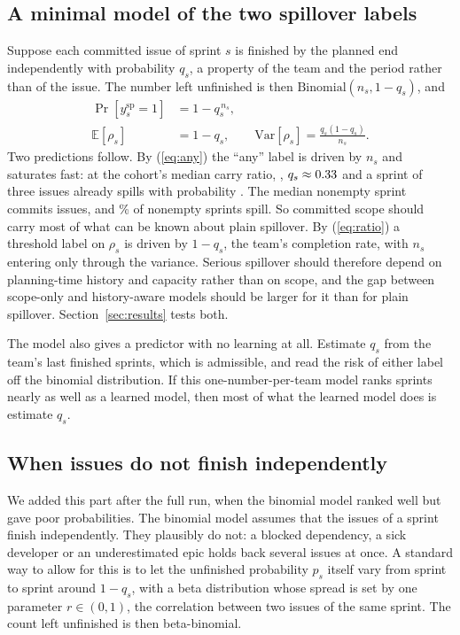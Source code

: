 \subsection{A minimal model of the two spillover labels}

Suppose each committed issue of sprint $s$ is finished by the planned end independently with probability $q_s$, a property of the team and the period rather than of the issue. The number left unfinished is then $\mathrm{Binomial}(n_s, 1 - q_s)$, and
\begin{align}
\Pr[y^{\mathrm{sp}}_s = 1] &= 1 - q_s^{\,n_s}, \label{eq:any}\\
\mathbb{E}[\rho_s] &= 1 - q_s, \qquad \mathrm{Var}[\rho_s] = \frac{q_s (1 - q_s)}{n_s}. \label{eq:ratio}
\end{align}
Two predictions follow. By (\ref{eq:any}) the ``any'' label is driven by $n_s$ and saturates fast: at the cohort's median carry ratio, \CarryMedian, $q_s \approx 0.33$ and a sprint of three issues already spills with probability \PSpillThree. The median nonempty sprint commits \MedianIssues{} issues, and \NonemptySpill\% of nonempty sprints spill. So committed scope should carry most of what can be known about plain spillover. By (\ref{eq:ratio}) a threshold label on $\rho_s$ is driven by $1 - q_s$, the team's completion rate, with $n_s$ entering only through the variance. Serious spillover should therefore depend on planning-time history and capacity rather than on scope, and the gap between scope-only and history-aware models should be larger for it than for plain spillover. Section~\ref{sec:results} tests both.

The model also gives a predictor with no learning at all. Estimate $q_s$ from the team's last finished sprints, which is admissible, and read the risk of either label off the binomial distribution. If this one-number-per-team model ranks sprints nearly as well as a learned model, then most of what the learned model does is estimate $q_s$.

\subsection{When issues do not finish independently}
\label{sec:overdisp}

We added this part after the full run, when the binomial model ranked well but gave poor probabilities. The binomial model assumes that the issues of a sprint finish independently. They plausibly do not: a blocked dependency, a sick developer or an underestimated epic holds back several issues at once. A standard way to allow for this \cite{skellam1948} is to let the unfinished probability $p_s$ itself vary from sprint to sprint around $1 - q_s$, with a beta distribution whose spread is set by one parameter $r \in (0, 1)$, the correlation between two issues of the same sprint. The count left unfinished is then beta-binomial.

